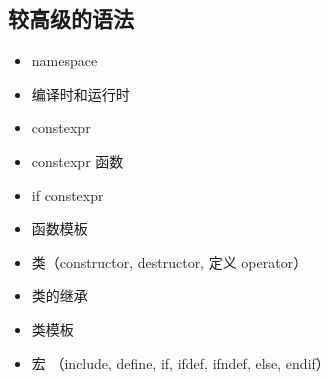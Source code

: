 \subsection{较高级的语法}
\begin{itemize}
\item namespace
\item 编译时和运行时
\item constexpr
\item constexpr 函数
\item if constexpr
\item 函数模板
\item 类（constructor, destructor, 定义 operator）
\item 类的继承
\item 类模板
\item 宏 （include, define, if, ifdef, ifndef, else, endif）
\end{itemize}

